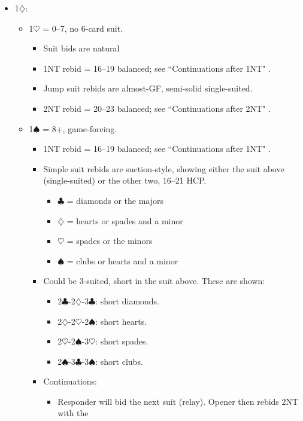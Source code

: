 \documentclass[a4paper,14pt]{extarticle}
\begin{document}
\begin{itemize}
\newpage

\item 1$\diamondsuit$:
	\begin{itemize}
   \item 1$\heartsuit$ = 0--7, no 6-card suit.
		\begin{itemize}
		\item Suit bids are natural
      \item 1NT rebid = 16--19 balanced; see ``Continuations after 1NT" .
      \item Jump suit rebids are almost-GF, semi-solid single-suited.
      \item 2NT rebid = 20--23 balanced; see ``Continuations after 2NT" .
		\end{itemize}
   \item 1$\spadesuit$ = 8+, game-forcing.
		\begin{itemize}
      \item 1NT rebid = 16--19 balanced; see ``Continuations after 1NT" .
      \item Simple suit rebids are suction-style, showing either the suit above
         (single-suited) or the other two, 16--21 HCP.
			\begin{itemize}
			\item $\clubsuit$ = diamonds or the majors
			\item $\diamondsuit$ = hearts or spades and a minor
			\item $\heartsuit$ = spades or the minors
			\item $\spadesuit$ = clubs or hearts and a minor
			\end{itemize}
		\item Could be 3-suited, short in the suit above. These are shown: 
			\begin{itemize}
         \item 2$\clubsuit$-2$\diamondsuit$-3$\clubsuit$: short diamonds.
			\item 2$\diamondsuit$-2$\heartsuit$-2$\spadesuit$: short hearts. 
			\item 2$\heartsuit$-2$\spadesuit$-3$\heartsuit$: short spades.
         \item 2$\spadesuit$-3$\clubsuit$-3$\spadesuit$: short clubs.
			\end{itemize}
		\item Continuations:
			\begin{itemize}
			\item Responder will bid the next suit (relay). Opener then rebids 2NT with the

\end{itemize}
\end{itemize}
\end{itemize}
\end{itemize}
\end{document}
